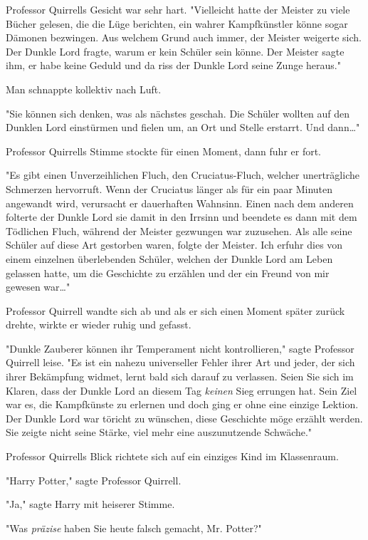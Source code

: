 {Professor Quirrells Gesicht war sehr hart. "Vielleicht hatte der Meister zu viele Bücher gelesen, die die Lüge berichten, ein wahrer Kampfkünstler könne sogar Dämonen bezwingen. Aus welchem Grund auch immer, der Meister weigerte sich. Der Dunkle Lord fragte, warum er kein Schüler sein könne. Der Meister sagte ihm, er habe keine Geduld und da riss der Dunkle Lord seine Zunge heraus."

Man schnappte kollektiv nach Luft.

"Sie können sich denken, was als nächstes geschah. Die Schüler wollten auf den Dunklen Lord einstürmen und fielen um, an Ort und Stelle erstarrt. Und dann…"

Professor Quirrells Stimme stockte für einen Moment, dann fuhr er fort.

"Es gibt einen Unverzeihlichen Fluch, den Cruciatus-Fluch, welcher unerträgliche Schmerzen hervorruft. Wenn der Cruciatus länger als für ein paar Minuten angewandt wird, verursacht er dauerhaften Wahnsinn. Einen nach dem anderen folterte der Dunkle Lord sie damit in den Irrsinn und beendete es dann mit dem Tödlichen Fluch, während der Meister gezwungen war zuzusehen. Als alle seine Schüler auf diese Art gestorben waren, folgte der Meister. Ich erfuhr dies von einem einzelnen überlebenden Schüler, welchen der Dunkle Lord am Leben gelassen hatte, um die Geschichte zu erzählen und der ein Freund von mir gewesen war…"

Professor Quirrell wandte sich ab und als er sich einen Moment später zurück drehte, wirkte er wieder ruhig und gefasst.

"Dunkle Zauberer können ihr Temperament nicht kontrollieren," sagte Professor Quirrell leise. "Es ist ein nahezu universeller Fehler ihrer Art und jeder, der sich ihrer Bekämpfung widmet, lernt bald sich darauf zu verlassen. Seien Sie sich im Klaren, dass der Dunkle Lord an diesem Tag \emph{keinen} Sieg errungen hat. Sein Ziel war es, die Kampfkünste zu erlernen und doch ging er ohne eine einzige Lektion. Der Dunkle Lord war töricht zu wünschen, diese Geschichte möge erzählt werden. Sie zeigte nicht seine Stärke, viel mehr eine auszunutzende Schwäche."

Professor Quirrells Blick richtete sich auf ein einziges Kind im Klassenraum.

"Harry Potter," sagte Professor Quirrell.

"Ja," sagte Harry mit heiserer Stimme.

"Was \emph{präzise} haben Sie heute falsch gemacht, Mr. Potter?"

}
